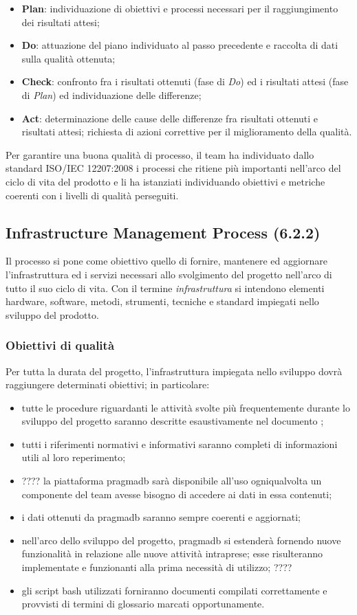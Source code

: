 \begin{itemize}
\item \textbf{Plan}: individuazione di obiettivi e processi necessari per il raggiungimento dei risultati attesi;
\item \textbf{Do}: attuazione del piano individuato al passo precedente e raccolta di dati sulla qualità ottenuta;
\item \textbf{Check}: confronto fra i risultati ottenuti (fase di \textit{Do}) ed i risultati attesi (fase di \textit{Plan}) ed individuazione delle differenze;
\item \textbf{Act}: determinazione delle cause delle differenze fra risultati ottenuti e risultati attesi; richiesta di azioni correttive per il miglioramento della qualità.
\end{itemize}
Per garantire una buona qualità di processo, il team ha individuato dallo standard ISO/IEC 12207:2008 i processi che ritiene più importanti nell'arco del ciclo di vita del prodotto e li ha istanziati individuando obiettivi e metriche coerenti con i livelli di qualità perseguiti.
\subsection{Infrastructure Management Process (6.2.2)}
\label{infraMgmt}
Il processo si pone come obiettivo quello di fornire, mantenere ed aggiornare l'infrastruttura ed i servizi necessari allo svolgimento del progetto nell'arco di tutto il suo ciclo di vita. Con il termine \textit{infrastruttura} si intendono elementi hardware, software, metodi, strumenti, tecniche e standard impiegati nello sviluppo del prodotto.
\subsubsection{Obiettivi di qualità}
Per tutta la durata del progetto, l'infrastruttura impiegata nello sviluppo dovrà raggiungere determinati obiettivi; in particolare:
\begin{itemize}
\item tutte le procedure riguardanti le attività svolte più frequentemente durante lo sviluppo del progetto saranno descritte esaustivamente nel documento \NdP;
\item tutti i riferimenti normativi e informativi saranno completi di informazioni utili al loro reperimento;
\item ???? la piattaforma pragmadb sarà disponibile all'uso ogniqualvolta un componente del team avesse bisogno di accedere ai dati in essa contenuti; 
\item i dati ottenuti da pragmadb saranno sempre coerenti e aggiornati;
\item nell'arco dello sviluppo del progetto, pragmadb si estenderà fornendo nuove funzionalità in relazione alle nuove attività intraprese; esse risulteranno implementate e funzionanti alla prima necessità di utilizzo; ????
\item gli script bash utilizzati forniranno documenti compilati correttamente e provvisti di termini di glossario marcati opportunamente.
\end{itemize}
